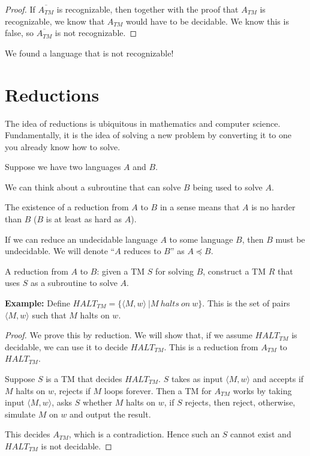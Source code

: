 
\begin{proof}
	
	If $\overline{A_{TM}}$ is recognizable, then together with the proof that $A_{TM}$ is recognizable, we know that $A_{TM}$ would have to be decidable.  We know this is false, so $\overline{A_{TM}}$ is not recognizable.
\end{proof}


We found a language that is not recognizable!


\section*{Reductions}

The idea of reductions is ubiquitous in mathematics and computer science.  Fundamentally, it is the idea of solving a new problem by converting it to one you already know how to solve.

Suppose we have two languages $A$ and $B$.


We can think about a subroutine that can solve $B$ being used to solve $A$.

The existence of a reduction from $A$ to $B$ in a sense means that $A$ is no harder than $B$ ($B$ is at least as hard as $A$).

If we can reduce an undecidable language $A$ to some language $B$, then $B$ must be undecidable.  We will denote ``$A$ reduces to $B$'' as $A\preceq B$.


A reduction from $A$ to $B$: given a TM $S$ for solving $B$, construct a TM $R$ that uses $S$ as a subroutine to solve $A$.

\textbf{Example:}  Define $HALT_{TM} = \{ \langle M,w \rangle \ | M \ halts \ on \ w  \}$.  This is the set of pairs $\langle M,w\rangle$ such that $M$ halts on $w$.


\begin{proof}
	We prove this by reduction.  We will show that, if we assume $HALT_{TM}$ is decidable, we can use it to decide $HALT_{TM}$.  This is a reduction from $A_{TM}$ to $HALT_{TM}$.
	
	Suppose $S$ is a TM that decides $HALT_{TM}$. $S$ takes as input $\langle M,w \rangle$ and accepts if $M$ halts on $w$, rejects if $M$ loops forever.  Then a TM for $A_{TM}$ works by taking input $\langle M,w \rangle$, asks $S$ whether $M$ halts on $w$, if $S$ rejects, then reject, otherwise, simulate $M$ on $w$ and output the result.
	
	This decides $A_{TM}$, which is a contradiction.  Hence such an $S$ cannot exist and $HALT_{TM}$ is not decidable.
	
	
	
\end{proof}


